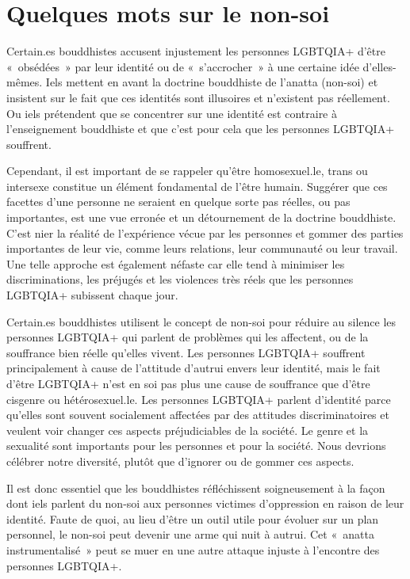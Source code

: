 \documentclass[12pt,openany]{book}
\begin{document}
\section*{Quelques mots sur le non-soi}

\noindent Certain.es bouddhistes accusent injustement les personnes \mbox{LGBTQIA+} d’être \mbox{« obsédées »} par leur identité ou de \mbox{« s’accrocher »} à une certaine idée d’elles-mêmes. Iels mettent en avant la doctrine bouddhiste de l’anatta (non-soi) et insistent sur le fait que ces identités sont illusoires et n’existent pas réellement. Ou iels prétendent que se concentrer sur une identité est contraire à l’enseignement bouddhiste et que c’est pour cela que les personnes \mbox{LGBTQIA+} souffrent.

Cependant, il est important de se rappeler qu’être homosexuel.le, trans ou intersexe constitue un élément fondamental de l’être humain. Suggérer que ces facettes d’une personne ne seraient en quelque sorte pas réelles, ou pas importantes, est une vue erronée et un détournement de la doctrine bouddhiste. C’est nier la réalité de l’expérience vécue par les personnes et gommer des parties importantes de leur vie, comme leurs relations, leur communauté ou leur travail. Une telle approche est également néfaste car elle tend à minimiser les discriminations, les préjugés et les violences très réels que les personnes \mbox{LGBTQIA+} subissent chaque jour.

Certain.es bouddhistes utilisent le concept de non-soi pour réduire au silence les personnes \mbox{LGBTQIA+} qui parlent de problèmes qui les affectent, ou de la souffrance bien réelle qu’elles vivent. Les personnes \mbox{LGBTQIA+} souffrent principalement à cause de l’attitude d’autrui envers leur identité, mais le fait d’être \mbox{LGBTQIA+} n’est en soi pas plus une cause de souffrance que d’être cisgenre ou hétérosexuel.le. Les personnes \mbox{LGBTQIA+} parlent d’identité parce qu’elles sont souvent socialement affectées par des attitudes discriminatoires et veulent voir changer ces aspects préjudiciables de la société. Le genre et la sexualité sont importants pour les personnes et pour la société. Nous devrions célébrer notre diversité, plutôt que d’ignorer ou de gommer ces aspects.

Il est donc essentiel que les bouddhistes réfléchissent soigneusement à la façon dont iels parlent du non-soi aux personnes victimes d’oppression en raison de leur identité. Faute de quoi, au lieu d’être un outil utile pour évoluer sur un plan personnel, le non-soi peut devenir une arme qui nuit à autrui. Cet \mbox{« a}natta instrumentalis\mbox{é »} peut se muer en une autre attaque injuste à l’encontre des personnes \mbox{LGBTQIA+}.
\end{document}
